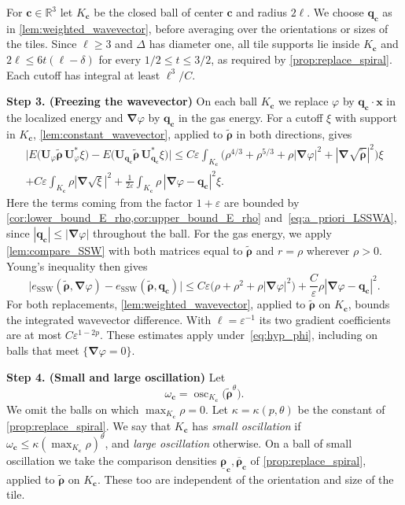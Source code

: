 \documentclass[final,reqno]{amsart}
\theoremstyle{remark}
\renewcommand{\le}{\leqslant}
\renewcommand{\ge}{\geqslant}
\renewcommand{\epsilon}{\varepsilon}
\newcommand{\ol}[1]{\overline{#1}}
\newcommand{\ul}[1]{\underline{#1}}
\newcommand{\wt}[1]{\widetilde{#1}}
\newcommand{\RR}{\mathbb{R}}
\newcommand{\SSW}{\mathrm{SSW}}
\newcommand{\grad}{\bm{\nabla}}
\newcommand{\tetra}{\mathbb{\Delta}}
\begin{document}
For $\mathbf{c}\in\RR^3$ let $K_{\mathbf{c}}$ be the closed ball of center $\mathbf{c}$ and radius $2\ell$. We choose $\mathbf{q}_{\mathbf{c}}$ as in \cref{lem:weighted_wavevector}, before averaging over the orientations or sizes of the tiles. Since $\ell\ge3$ and $\tetra$ has diameter one, all tile supports lie inside $K_{\mathbf{c}}$ and $2\ell\le6t(\ell-\delta)$ for every $1/2\le t\le3/2$, as required by \cref{prop:replace_spiral}. Each cutoff has integral at least $\ell^3/C$.

\medskip

\noindent\textbf{Step 3. (Freezing the wavevector)} On each ball $K_{\mathbf{c}}$ we replace $\varphi$ by $\mathbf{q}_{\mathbf{c}}\cdot\mathbf{x}$ in the localized energy and $\grad\varphi$ by $\mathbf{q}_{\mathbf{c}}$ in the gas energy. For a cutoff $\xi$ with support in $K_{\mathbf{c}}$, \cref{lem:constant_wavevector}, applied to $\wt{\bm{\rho}}$ in both directions, gives
\begin{multline*}
\Big|E\big(\mathbf{U}_\varphi\wt{\bm{\rho}}\,\mathbf{U}_\varphi^*\xi\big)-E\big(\mathbf{U}_{\mathbf{q}_{\mathbf{c}}}\wt{\bm{\rho}}\,\mathbf{U}_{\mathbf{q}_{\mathbf{c}}}^*\xi\big)\Big|
\le C\epsilon\int_{K_{\mathbf{c}}}\big(\rho^{4/3}+\rho^{5/3}+\rho|\grad\varphi|^2+|\grad\sqrt{\wt{\bm{\rho}}}|^2\big)\xi\\
+C\epsilon\int_{K_{\mathbf{c}}}\rho|\grad\sqrt\xi|^2+\frac1{2\epsilon}\int_{K_{\mathbf{c}}}\rho\,|\grad\varphi-\mathbf{q}_{\mathbf{c}}|^2\xi.
\end{multline*}
Here the terms coming from the factor $1+\epsilon$ are bounded by \cref{cor:lower_bound_E_rho,cor:upper_bound_E_rho} and~\cref{eq:a_priori_LSSWA}, since $|\mathbf{q}_{\mathbf{c}}|\le|\grad\varphi|$ throughout the ball. For the gas energy, we apply \cref{lem:compare_SSW} with both matrices equal to $\wt{\bm{\rho}}$ and $r=\rho$ wherever $\rho>0$. Young's inequality then gives
\[
\big|e_\SSW(\wt{\bm{\rho}},\grad\varphi)-e_\SSW(\wt{\bm{\rho}},\mathbf{q}_{\mathbf{c}})\big|
\le C\epsilon\big(\rho+\rho^2+\rho|\grad\varphi|^2\big)
+\frac C\epsilon\rho|\grad\varphi-\mathbf{q}_{\mathbf{c}}|^2 .
\]
For both replacements, \cref{lem:weighted_wavevector}, applied to $\wt{\bm{\rho}}$ on $K_{\mathbf{c}}$, bounds the integrated wavevector difference. With $\ell=\epsilon^{-1}$ its two gradient coefficients are at most $C\epsilon^{1-2p}$. These estimates apply under~\cref{eq:hyp_phi}, including on balls that meet $\{\grad\varphi=0\}$.

\medskip

\noindent\textbf{Step 4. (Small and large oscillation)} Let
$$
\omega_{\mathbf{c}}=\operatorname{osc}_{K_{\mathbf{c}}}\big(\wt{\bm{\rho}}^\theta\big).
$$
We omit the balls on which $\max_{K_{\mathbf{c}}}\rho=0$. Let $\kappa=\kappa(p,\theta)$ be the constant of \cref{prop:replace_spiral}. We say that $K_{\mathbf{c}}$ has \emph{small oscillation} if $\omega_{\mathbf{c}}\le\kappa(\max_{K_{\mathbf{c}}}\rho)^\theta$, and \emph{large oscillation} otherwise. On a ball of small oscillation we take the comparison densities $\ul{\bm{\rho}}_{\mathbf{c}},\ol{\bm{\rho}}_{\mathbf{c}}$ of \cref{prop:replace_spiral}, applied to $\wt{\bm{\rho}}$ on $K_{\mathbf{c}}$. These too are independent of the orientation and size of the tile.
\end{document}
